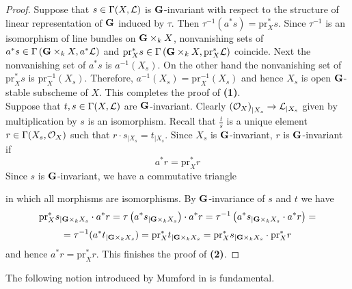 \begin{proof}
Suppose that $s\in \Gamma(X,{\mathcal L})$ is $\mathbf{G}$-invariant with respect to the structure of linear representation of $\mathbf{G}$ induced by $\tau$. Then $\tau^{-1}(a^*s) = \mathrm{pr}_X^*s$. Since $\tau^{-1}$ is an isomorphism of line bundles on $\mathbf{G}\times_kX$, nonvanishing sets of $a^*s \in \Gamma\left(\mathbf{G}\times_kX,a^*{\mathcal L}\right)$ and $\mathrm{pr}_X^*s \in \Gamma\left(\mathbf{G}\times_kX,\mathrm{pr}_X^*{\mathcal L}\right)$ coincide. Next the nonvanishing set of $a^*s$ is $a^{-1}(X_s)$. On the other hand the nonvanishing set of $\mathrm{pr}_X^*s$ is $\mathrm{pr}_X^{-1}(X_s)$. Therefore, $a^{-1}(X_s) = \mathrm{pr}_X^{-1}(X_s)$ and hence $X_s$ is open $\mathbf{G}$-stable subscheme of $X$. This completes the proof of \textbf{(1)}.\\
Suppose that $t,s\in \Gamma(X,{\mathcal L})$ are $\mathbf{G}$-invariant. Clearly $\left({\mathcal O}_{X}\right)_{\mid X_s} \rightarrow {\mathcal L}_{\mid X_s}$ given by multiplication by $s$ is an isomorphism. Recall that $\frac{t}{s}$ is a unique element $r \in \Gamma(X_s,{\mathcal O}_X)$ such that $r\cdot s_{\mid X_s} = t_{\mid X_s}$. Since $X_s$ is $\mathbf{G}$-invariant, $r$ is $\mathbf{G}$-invariant if 
$$a^*r = \mathrm{pr}_X^*r$$
Since $s$ is $\mathbf{G}$-invariant, we have a commutative triangle
\begin{center}
\end{center}
in which all morphisms are isomorphisms. By $\mathbf{G}$-invariance of $s$ and $t$ we have
$$\mathrm{pr}_X^*s_{\mid \mathbf{G}\times_kX_s} \cdot a^*r = \tau\left(a^*s_{\mid \mathbf{G}\times_kX_s}\right)\cdot a^*r = \tau^{-1}\left(a^*s_{\mid \mathbf{G}\times_kX_s}\cdot a^*r\right) =$$
$$= \tau^{-1}(a^*t_{\mid \mathbf{G}\times_kX_s}) = \mathrm{pr}_X^*t_{\mid \mathbf{G}\times_kX_s} = \mathrm{pr}_X^*s_{\mid \mathbf{G}\times_kX_s}\cdot \mathrm{pr}_X^*r$$
and hence $a^*r = \mathrm{pr}_X^*r$. This finishes the proof of \textbf{(2)}.
\end{proof}
\noindent
The following notion introduced by Mumford in \cite{mumford1994geometric} is fundamental.

